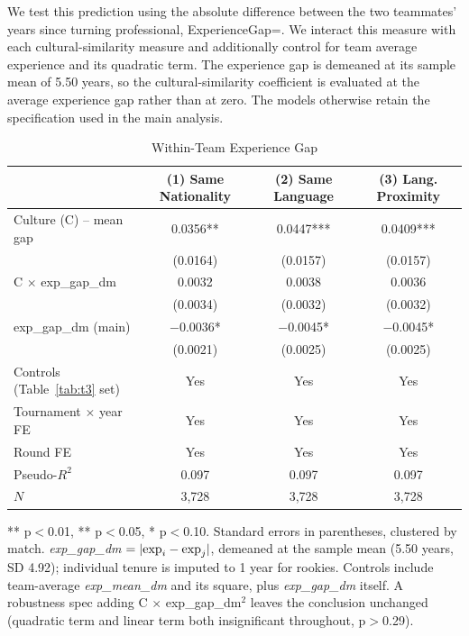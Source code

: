 \documentclass[10pt]{article}
\begin{document}
We test this prediction using the absolute difference between the two teammates' years since turning professional, ExperienceGap=. We interact this measure with each cultural-similarity measure and additionally control for team average experience and its quadratic term. The experience gap is demeaned at its sample mean of 5.50 years, so the cultural-similarity coefficient is evaluated at the average experience gap rather than at zero. The models otherwise retain the specification used in the main analysis.


\begin{table}[htbp]
\color{blue}
\centering
\caption{Within-Team Experience Gap \label{tab:t6b}}
\begin{threeparttable}
\begin{tabular}{lccc}
\toprule
 & (1) Same Nationality & (2) Same Language & (3) Lang. Proximity \\
\midrule
Culture (C) -- mean gap & 0.0356** & 0.0447*** & 0.0409*** \\
 & (0.0164) & (0.0157) & (0.0157) \\
C $\times$ exp\_gap\_dm & 0.0032 & 0.0038 & 0.0036 \\
 & (0.0034) & (0.0032) & (0.0032) \\
exp\_gap\_dm (main) & $-$0.0036* & $-$0.0045* & $-$0.0045* \\
 & (0.0021) & (0.0025) & (0.0025) \\
\midrule
Controls (Table~\ref{tab:t3} set) & Yes & Yes & Yes \\
Tournament $\times$ year FE & Yes & Yes & Yes \\
Round FE & Yes & Yes & Yes \\
Pseudo-$R^2$ & 0.097 & 0.097 & 0.097 \\
$N$ & 3,728 & 3,728 & 3,728 \\
\bottomrule
\end{tabular}
\begin{tablenotes}
\small
\item *** p$<$0.01, ** p$<$0.05, * p$<$0.10. Standard errors in parentheses, clustered by match. \textit{exp\_gap\_dm} $=|{\rm exp}_i-{\rm exp}_j|$, demeaned at the sample mean (5.50 years, SD 4.92); individual tenure is imputed to 1 year for rookies. Controls include team-average \textit{exp\_mean\_dm} and its square, plus \textit{exp\_gap\_dm} itself. A robustness spec adding C $\times$ exp\_gap\_dm$^2$ leaves the conclusion unchanged (quadratic term and linear term both insignificant throughout, p$>$0.29).
\end{tablenotes}
\end{threeparttable}
\end{table}
\FloatBarrier
\end{document}
